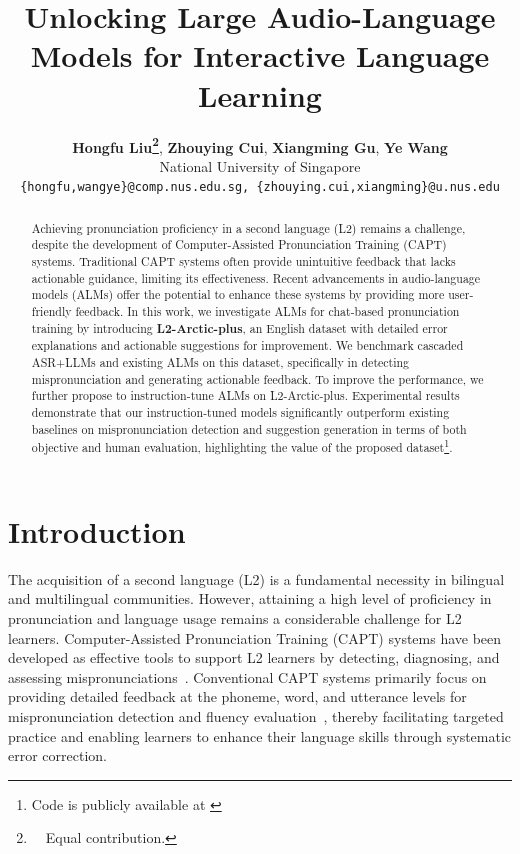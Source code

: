 \documentclass[11pt]{article}
\title{Unlocking Large Audio-Language Models for Interactive Language Learning}
\author{
 \textbf{Hongfu Liu\thanks{\ \ Equal contribution.}},
 \textbf{Zhouying Cui\footnotemark[1]},
 \textbf{Xiangming Gu\footnotemark[1]},
 \textbf{Ye Wang}
\\
 National University of Singapore \\
 \texttt{\{hongfu,wangye\}@comp.nus.edu.sg, \{zhouying.cui,xiangming\}@u.nus.edu}
}
\begin{document}
\maketitle
\begin{abstract}

Achieving pronunciation proficiency in a second language (L2) remains a challenge, despite the development of Computer-Assisted Pronunciation Training (CAPT) systems. Traditional CAPT systems often provide unintuitive feedback that lacks actionable guidance, limiting its effectiveness. Recent advancements in audio-language models (ALMs) offer the potential to enhance these systems by providing more user-friendly feedback. In this work, we investigate ALMs for chat-based pronunciation training by introducing \textbf{L2-Arctic-plus}, an English dataset with detailed error explanations and actionable suggestions for improvement. We benchmark cascaded ASR+LLMs and existing ALMs on this dataset, specifically in detecting mispronunciation and generating actionable feedback. To improve the performance, we further propose to instruction-tune ALMs on L2-Arctic-plus. Experimental results demonstrate that our instruction-tuned models significantly outperform existing baselines on mispronunciation detection and suggestion generation in terms of both objective and human evaluation, highlighting the value of the proposed dataset\footnote{Code is publicly available at \href{https://github.com/zoeyada/ALMs4Learning}{}}. 

\end{abstract}

\section{Introduction}


The acquisition of a second language (L2) is a fundamental necessity in bilingual and multilingual communities. However, attaining a high level of proficiency in pronunciation and language usage remains a considerable challenge for L2 learners. Computer-Assisted Pronunciation Training (CAPT) systems have been developed as effective tools to support L2 learners by detecting, diagnosing, and assessing mispronunciations~\cite{capt1,capt2}. Conventional CAPT systems primarily focus on providing detailed feedback at the phoneme, word, and utterance levels for mispronunciation detection and fluency evaluation~\cite{phonegop2000,speechocean762,kheir2023automatic}, thereby facilitating targeted practice and enabling learners to enhance their language skills through systematic error correction. 
\end{document}
